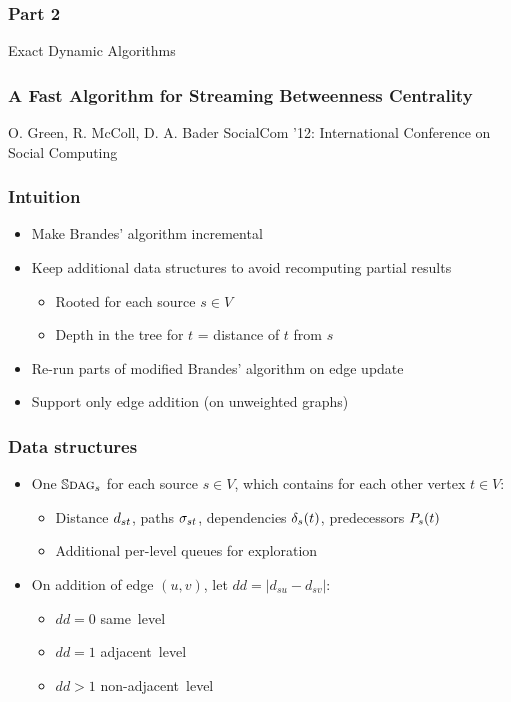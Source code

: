 
\begin{frame}
  \frametitle{Part 2}
  \centering
  \Huge Exact Dynamic Algorithms
\end{frame}


\begin{frame}
  \frametitle{A Fast Algorithm for Streaming Betweenness Centrality}
  \centering
  \vfill
  {\huge O. Green, R. McColl, D. A. Bader}
  \vfill
  {\large SocialCom '12: International Conference on Social Computing}
\end{frame}


\begin{frame}
  \frametitle{Intuition}

  \begin{itemize}
    \item Make Brandes' algorithm incremental
    \item Keep additional data structures to avoid recomputing partial results
    \begin{itemize}
      \item Rooted \spdag for each source $s \in V$
      \item Depth in the tree for $t$ = distance of $t$ from $s$
    \end{itemize}
    \item Re-run parts of modified Brandes' algorithm on edge update
    \item Support only edge addition (on unweighted graphs)
  \end{itemize}
    
\end{frame}


\begin{frame}
  \frametitle{Data structures}

  \begin{itemize}
    \item One $\mathbb{S}\textsc{dag}_s$ for each source $s \in V$, which contains for each other vertex $t \in V$:
    \begin{itemize}
      \item Distance $d_{st}$, paths $\sigma_{st}$, dependencies $\delta_{s}(t)$, predecessors $P_{s}(t)$
      \item Additional per-level queues for exploration
    \end{itemize}
  \end{itemize}
  \begin{itemize}
    \item On addition of edge $(u,v)$, let $dd = |d_{su} - d_{sv}|$:
    \begin{itemize}
      \item $dd = 0$ same~level
      \item $dd = 1$ adjacent~level
      \item $dd > 1$ non-adjacent~level
    \end{itemize}
  \end{itemize}
      
\end{frame}


